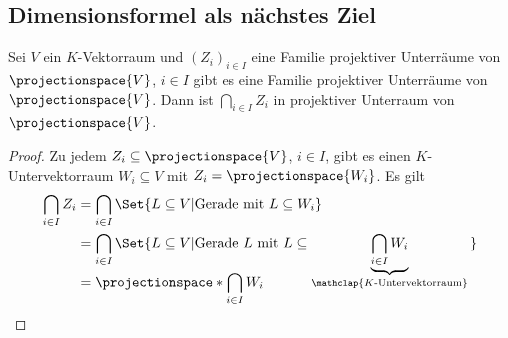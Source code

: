 \subsection*{Dimensionsformel als nächstes Ziel}
\begin{lemma}\label{schnitt_von_projektiven_unterraeumen_ist_projektiver_unterraum}
  Sei \( V \) ein \( K \)-Vektorraum und \( (Z_i)_{i\in I} \) eine Familie projektiver Unterräume von \( \projectionspace{V} \), \( i\in I \) gibt es eine Familie projektiver Unterräume von \( \projectionspace{V} \). Dann ist \( \bigcap_{i\in I} Z_i \) in projektiver Unterraum von \( \projectionspace{V} \).
\end{lemma}
\begin{proof}
  Zu jedem \( Z_i\subseteq \projectionspace{V} \), \( i\in I \), gibt es einen \( K \)-Untervektorraum \( W_i\subseteq V \) mit \( Z_i=\projectionspace{W_i} \). Es gilt
  \begin{equation*}
    \begin{split}
      \bigcap_{i\in I}Z_i&=\bigcap_{i\in I}\Set{L\subseteq V|\text{Gerade mit \( L\subseteq W_i \)}}\\
      &=\bigcap_{i\in I}\Set{L\subseteq V|\text{Gerade \( L \) mit \( L\subseteq  \smash{\underbrace{\bigcap_{i\in I}W_i}_{\mathclap{\text{\( K \)-Untervektorraum}}}\vphantom{\bigcup_{i\in I}}}\)}}\\
      &=\projectionspace*{\bigcap_{i\in I} W_i}
    \end{split}
  \end{equation*}
\end{proof}
\addtocounter{beispiel}{-1}
